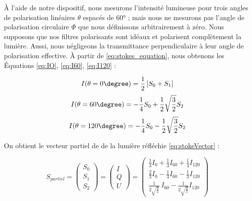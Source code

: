 À l'aide de notre dispositif, nous mesurons l'intensité lumineuse pour trois angles de polarisation linéaires $\theta$ espacés de 60° ; mais nous ne mesurons pas l'angle de polarisation circulaire $\Phi$ que nous définissons arbitrairement à zéro.
Nous supposons que nos filtres polarisants sont idéaux et polarisent complètement la lumière.
Aussi, nous négligeons la transmittance perpendiculaire à leur angle de polarisation effective.
À partir de \ref{eq:stokes_equation}, nous obtenons les Équations \ref{eq:IO}, \ref{eq:I60}, \ref{eq:I120} :

\begin{equation} \label{eq:IO}
	I(\theta=0\degree) = \frac{1}{2}\left[S_0 + S_1\right]
\end{equation}
\begin{equation} \label{eq:I60}
	I(\theta=60\degree) = -\frac{1}{4} S_0 + \frac{1}{2} \sqrt{\frac{3}{2}} S_2
\end{equation}
\begin{equation} \label{eq:I120}
	I(\theta=120\degree) = -\frac{1}{4} S_0 - \frac{1}{2} \sqrt{\frac{3}{2}} S_2
\end{equation}

On obtient le vecteur partiel de \citeauthor{stokes_composition_1851} de la lumière réfléchie \ref{eq:stokeVector} \cite{li_method_2014} :

\begin{equation}
	S_{partiel} =
	\left(\!\!\!
		\begin{array}{c}
			S_0 \\
			S_1 \\
			S_2
		\end{array}
	\!\!\!\right) =
	\left(\!\!\!
		\begin{array}{c}
			I \\
			Q \\
			U
		\end{array}
	\!\!\!\right) =
	\left(\!\!\!
		\begin{array}{c}
			\frac{1}{3} I_{0} + \frac{1}{3} I_{60} + \frac{1}{3} I_{120} \\
			\frac{2}{3} I_{0} - \frac{1}{3} I_{60} -  \frac{1}{3} I_{120} \\
			\frac{1}{2 \sqrt{\frac{3}{2}}} \ I_{60} - \frac{1}{2 \sqrt{\frac{3}{2}}} I_{120}
		\end{array}
	\!\!\!\right)
	\label{eq:stokeVector}
\end{equation}

